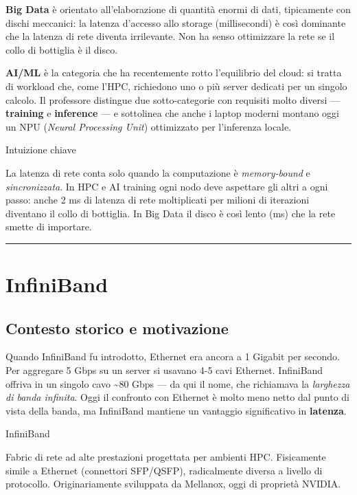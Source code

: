 \documentclass[
  italian,
  openany]{book}
\begin{document}
\textbf{Big Data} è orientato all'elaborazione di quantità enormi di
dati, tipicamente con dischi meccanici: la latenza d'accesso allo
storage (millisecondi) è così dominante che la latenza di rete diventa
irrilevante. Non ha senso ottimizzare la rete se il collo di bottiglia è
il disco.

\textbf{AI/ML} è la categoria che ha recentemente rotto l'equilibrio del
cloud: si tratta di workload che, come l'HPC, richiedono uno o più
server dedicati per un singolo calcolo. Il professore distingue due
sotto-categorie con requisiti molto diversi --- \textbf{training} e
\textbf{inference} --- e sottolinea che anche i laptop moderni montano
oggi un NPU (\emph{Neural Processing Unit}) ottimizzato per l'inferenza
locale.

\begin{callouttip}{Intuizione chiave}

La latenza di rete conta solo quando la computazione è
\emph{memory-bound} e \emph{sincronizzata}. In HPC e AI training ogni
nodo deve aspettare gli altri a ogni passo: anche 2 ms di latenza di
rete moltiplicati per milioni di iterazioni diventano il collo di
bottiglia. In Big Data il disco è così lento (ms) che la rete smette di
importare.

\end{callouttip}

\begin{center}\rule{0.5\linewidth}{0.5pt}\end{center}

\section{InfiniBand}\label{infiniband}

\subsection{Contesto storico e
motivazione}\label{contesto-storico-e-motivazione}

Quando InfiniBand fu introdotto, Ethernet era ancora a 1 Gigabit per
secondo. Per aggregare 5 Gbps su un server si usavano 4-5 cavi Ethernet.
InfiniBand offriva in un singolo cavo \textasciitilde80 Gbps --- da qui
il nome, che richiamava la \emph{larghezza di banda infinita}. Oggi il
confronto con Ethernet è molto meno netto dal punto di vista della
banda, ma InfiniBand mantiene un vantaggio significativo in
\textbf{latenza}.

\begin{calloutdefinition}{InfiniBand}

Fabric di rete ad alte prestazioni progettata per ambienti HPC.
Fisicamente simile a Ethernet (connettori SFP/QSFP), radicalmente
diversa a livello di protocollo. Originariamente sviluppata da Mellanox,
oggi di proprietà NVIDIA.

\end{calloutdefinition}
\end{document}

